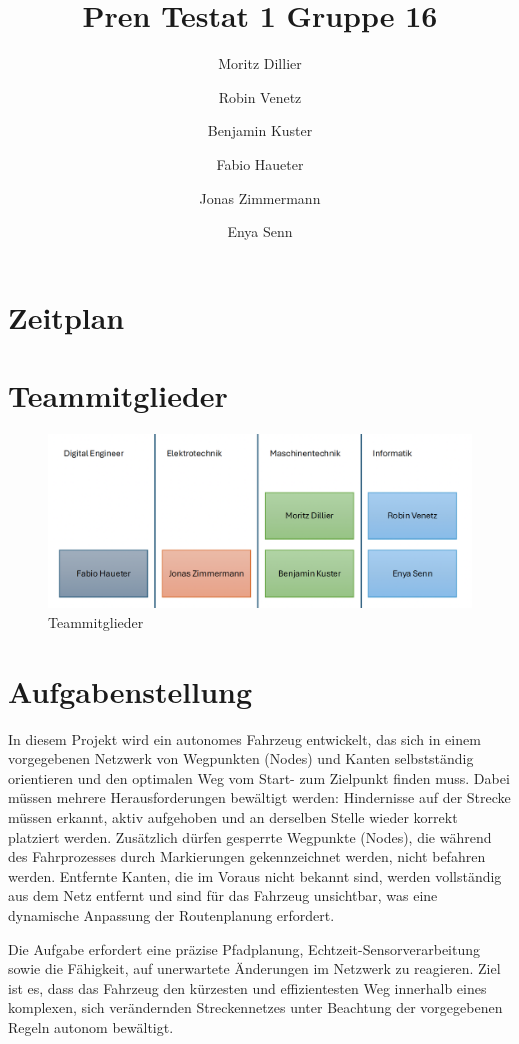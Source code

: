 \documentclass{article}
\title{Pren Testat 1 Gruppe 16}
\author{Moritz Dillier \and Robin Venetz \and Benjamin Kuster \and Fabio Haueter \and Jonas Zimmermann \and Enya Senn}
\date{\thedate}
\begin{document}
\maketitle

\tableofcontents 


\section{Zeitplan}

\section{Teammitglieder}
\begin{figure}[H]
    \centering
    \includegraphics[width=0.8\linewidth]{Images/Pren_Gruppe.png}
    \caption{Teammitglieder}
    \label{fig:enter-label}
\end{figure}


\section{Aufgabenstellung}
In diesem Projekt wird ein autonomes Fahrzeug entwickelt, das sich in einem vorgegebenen Netzwerk von Wegpunkten (Nodes) und Kanten selbstständig orientieren und den optimalen Weg vom Start- zum Zielpunkt finden muss. Dabei müssen mehrere Herausforderungen bewältigt werden: Hindernisse auf der Strecke müssen erkannt, aktiv aufgehoben und an derselben Stelle wieder korrekt platziert werden. Zusätzlich dürfen gesperrte Wegpunkte (Nodes), die während des Fahrprozesses durch Markierungen gekennzeichnet werden, nicht befahren werden. Entfernte Kanten, die im Voraus nicht bekannt sind, werden vollständig aus dem Netz entfernt und sind für das Fahrzeug unsichtbar, was eine dynamische Anpassung der Routenplanung erfordert.

\hfill \break
Die Aufgabe erfordert eine präzise Pfadplanung, Echtzeit-Sensorverarbeitung sowie die Fähigkeit, auf unerwartete Änderungen im Netzwerk zu reagieren. Ziel ist es, dass das Fahrzeug den kürzesten und effizientesten Weg innerhalb eines komplexen, sich verändernden Streckennetzes unter Beachtung der vorgegebenen Regeln autonom bewältigt.
\end{document}
